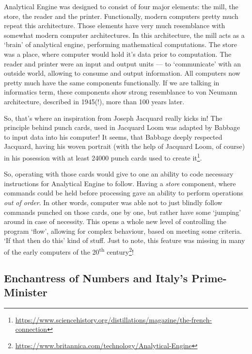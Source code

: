 \documentclass[../../what-is-computer]{subfiles}
\begin{document}
    Analytical Engine was designed to consist of four major elements: the mill, the store, the reader and the printer. Functionally, modern computers pretty much
    repeat this architecture. Those elements have very much resemblance with somewhat modern computer architectures. In this architecture, the mill acts as a `brain'
    of analytical engine, performing mathematical computations. The store was a place, where computer would hold it's data prior to computation. The reader and printer
    were an input and output units --- to `communicate' with an outside world, allowing to consume and output information. All computers now pretty much have the same 
    components functionally. If we are talking in informatics term, these components show strong resemblance to von Neumann architecture, described in 1945(!), more than
    100 years later. \par

    So, that's where an inspiration from Joseph Jacquard really kicks in! The principle behind punch cards, used in Jacquard Loom was adapted by Babbage to input data
    into his computer! It seems, that Babbage deeply respected Jacquard, having his woven portrait (with the help of Jacquard Loom, of course) in his 
    posession with at least \num{24000} punch cards used to create it\footnote{\href{https://www.sciencehistory.org/distillations/magazine/the-french-connection}
    {https://www.sciencehistory.org/distillations/magazine/the-french-connection}}. \par

    So, operating with those cards would give to one an ability to code necessary instructions for Analytical Engine to follow. Having a \emph{store} component, 
    where commands could be held before processing gave an ability to perform operations \emph{out of order}. In other words, computer was able not to just blindly
    follow commands punched on those cards, one by one, but rather have some `jumping' around in case of necessity. This opens a whole new level of controlling the
    program `flow', allowing for complex behaviour, based on meeting some criteria. `If that then do this' kind of stuff. Just to note, this feature was missing
    in many of the early computers of the 20\textsuperscript{th} century\footnote{\href{https://www.britannica.com/technology/Analytical-Engine}
    {https://www.britannica.com/technology/Analytical-Engine}}! \par

    \subsection{Enchantress of Numbers and Italy's Prime-Minister}
\end{document}
